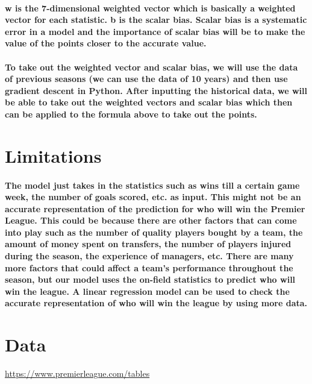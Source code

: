\documentclass[11pt]{article} %
\begin{document}
\paragraph{w is the 7-dimensional weighted vector which is basically a weighted vector for each statistic. b is the scalar bias. Scalar bias is a systematic error in a model and the importance of scalar bias will be to make the value of the points closer to the accurate value.}
\paragraph{To take out the weighted vector and scalar bias, we will use the data of previous seasons (we can use the data of 10 years) and then use gradient descent in Python. After inputting the historical data, we will be able to take out the weighted vectors and scalar bias which then can be applied to the formula above to take out the points.}
% 
% 
% 
% 
% 
% 
% 
% 
% 
\section{Limitations}
% 
% 
\paragraph{The model just takes in the statistics such as wins till a certain game week, the number of goals scored, etc. as input. This might not be an accurate representation of the prediction for who will win the Premier League. This could be because there are other factors that can come into play such as the number of quality players bought by a team, the amount of money spent on transfers, the number of players injured during the season, the experience of managers, etc. There are many more factors that could affect a team's performance throughout the season, but our model uses the on-field statistics to predict who will win the league. A linear regression model can be used to check the accurate representation of who will win the league by using more data.}
% 
% 
% 
% 
% 
% 
% 
% 
% 
\section{Data}
\href{https://www.premierleague.com/tables}{https://www.premierleague.com/tables}
% 
% 
% 
% 
\end{document}
